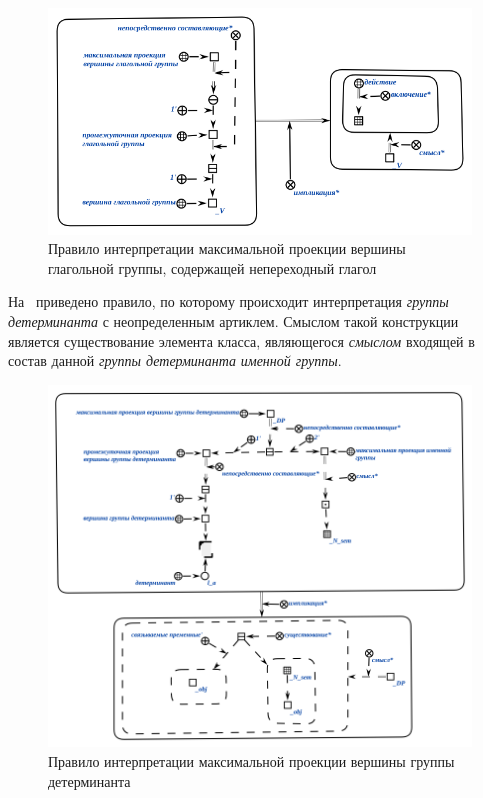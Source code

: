 \begin{figure}[h]
    \centering
    \includegraphics[scale=0.8]{images/part2/chapter_lang/d_sem_3}
    \caption{Правило интерпретации максимальной проекции вершины глагольной группы, содержащей непереходный глагол}
    \label{fig:d_sem_3}
\end{figure}

На~\textit{} приведено правило, по которому происходит интерпретация \textit{группы детерминанта} с неопределенным артиклем.
Смыслом такой конструкции является существование элемента класса, являющегося \textit{смыслом} входящей в состав данной \textit{группы детерминанта} \textit{именной группы}.

\begin{figure}[h]
    \centering
    \includegraphics[scale=0.8]{images/part2/chapter_lang/d_sem_4}
    \caption{Правило интерпретации максимальной проекции вершины группы детерминанта}
    \label{d_sem_4}
\end{figure}

